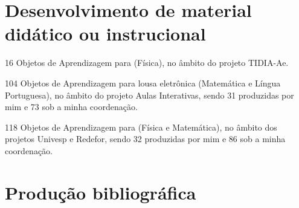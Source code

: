 \section*{Desenvolvimento de material didático ou instrucional}

\begin{compactitem}
	\item 16 Objetos de Aprendizagem para  (Física), no âmbito do projeto TIDIA-Ae.
	\item 104 Objetos de Aprendizagem para lousa eletrônica (Matemática e Língua Portuguesa), no âmbito do projeto Aulas Interativas, sendo 31 produzidas por mim e 73 sob a minha coordenação.
	\item 118 Objetos de Aprendizagem para  (Física e Matemática), no âmbito dos projetos Univesp e Redefor, sendo 32 produzidas por mim e 86 sob a minha coordenação.
\end{compactitem}

\section*{Produção bibliográfica}

